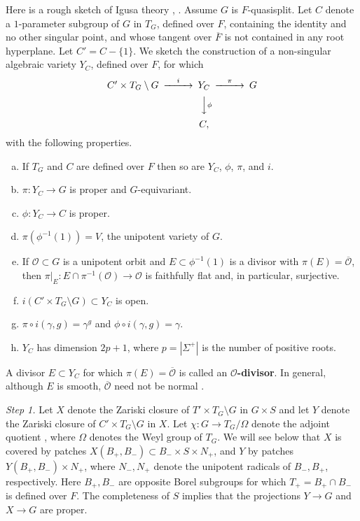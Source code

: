 \documentclass[12pt,letterpaper]{amsart}
\theoremstyle{plain}
\theoremstyle{definition}
\theoremstyle{remark}
\theoremstyle{definition}
\newcommand{\ovF}{\overline{F}}
\newcommand{\ooo}{\mathcal{O}}
\newcommand{\ovo}{\overline{\mathcal{O}}}
\begin{document}
Here is a rough sketch of Igusa theory \cite{La83}, \cite{Ha92a}.
Assume $G$ is $F$-quasisplit. Let $C$ denote a $1$-parameter subgroup of $G$
in $T_G$, defined over $F$, containing the identity
and no other singular point, and whose tangent over $\ovF$ is not
contained in any root hyperplane. Let $C'=C-\{1\}$. We sketch the
construction of a non-singular algebraic variety $Y_C$, defined over $F$,
for which
\[
\begin{CD}
C'\times T_G\setminus G @> i >> Y_C @> \pi >> G\\
@. @VV \phi V @. \\
@. C, @.
\end{CD}
\]
with the following properties.
\begin{enumerate}[(a)]
\item If $T_G$ and $C$ are defined over $F$ then so are
$Y_C$, $\phi$, $\pi$, and $i$.
\item $\pi : Y_C\rightarrow G$ is proper and $G$-equivariant.
\item $\phi : Y_C\rightarrow C$ is proper.
\item $\pi(\phi^{-1}(1))=V$, the unipotent variety of $G$.
\item If ${\mathcal O}\subset G$ is a unipotent orbit and $E\subset
\phi^{-1}(1)$ is a divisor with $\pi(E)=\ovo$, then
$\pi|_{E}:E\cap \pi^{-1}({\mathcal O})\rightarrow {\mathcal O}$
is faithfully flat
\cite[Ch.~II, Proposition~3.1]{DG80} and, in particular, surjective.
\item $i(C'\times T_G\setminus G)\subset Y_C$ is open.
\item $\pi\circ i(\gamma,g)=\gamma^g$ and $\phi\circ i(\gamma,g)=\gamma$.
\item $Y_C$ has dimension $2p+1$, where $p=|\Sigma^+|$
is the number of positive roots.
\end{enumerate}
A divisor $E\subset Y_C$ for which $\pi(E)=\ovo$ is called an
\textbf{$\ooo$-divisor}. In general, although $E$ is smooth,
$\ovo$ need not be normal \cite[\S 0]{KP79}.

\emph{Step 1.} Let $X$ denote the Zariski closure of $T'\times T_G\setminus G$
in $G\times S$ and let $Y$ denote the Zariski closure of
$C'\times T_G\setminus G$
in $X$. Let $\chi :G\rightarrow T_G/\Omega$ denote the adjoint
quotient \cite{Sl80}, where $\Omega$ denotes the Weyl group of $T_G$.
We will see below that $X$ is covered by patches
$X(B_+ ,B_{-})\subset B_{-}\times S\times N_+$, and $Y$ by patches
$Y(B_+ ,B_-)\times N_+$,
where $N_-,N_+$ denote the unipotent radicals of $B_-,B_+$, respectively.
Here $B_+,B_-$ are opposite Borel subgroups for which
$T_+=B_+\cap B_-$ is defined over $F$. The completeness
of $S$ implies that the projections $Y\rightarrow G$
and $X\rightarrow G$ are proper.
\end{document}
